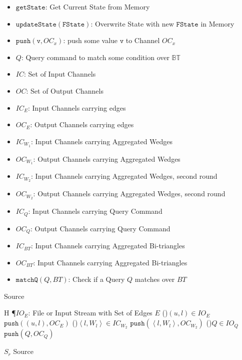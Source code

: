 \documentclass[12pt, a4paper]{article}
\newcommand{\bt}{\mathbb{BT}}
\newcommand{\st}{\mathtt{FState}}
\newcommand{\us}{\mathtt{updateState}}
\newcommand{\gs}{\mathtt{getState}}
\newcommand{\p}{\mathtt{push}}
\newcommand{\mt}{\mathtt{matchQ}}
\newcommand{\la}{\left\langle}
\newcommand{\ra}{\right\rangle}
\begin{document}
\begin{itemize}
      \item $\gs$: Get Current State from Memory
      \item $\us(\st)$: Overwrite State with new $\st$ in Memory
      \item $\p(\mathtt{v}, OC_x)$: push some value $\mathtt{v}$ to Channel $OC_x$
      \item $Q$: Query command to match some condition over $\bt$
      \item $IC$: Set of Input Channels
      \item $OC$: Set of Output Channels    
      \item $IC_E$: Input Channels carrying edges
      \item $OC_E$: Output Channels carrying edges
      \item $IC_{W_1}$: Input Channels carrying Aggregated Wedges
      \item $OC_{W_1}$: Output Channels carrying Aggregated Wedges
      \item $IC_{W_2}$: Input Channels carrying Aggregated Wedges, second round
      \item $OC_{W_2}$: Output Channels carrying Aggregated Wedges, second round
      \item $IC_Q$: Input Channels carrying Query Command
      \item $OC_Q$: Output Channels carrying Query Command
      \item $IC_{BT}$: Input Channels carrying Aggregated Bi-triangles 
      \item $OC_{BT}$: Input Channels carrying Aggregated Bi-triangles 
      \item $\mt(Q, BT)$: Check if a Query $Q$ matches over $BT$ 
\end{itemize}

Source

\begin{algorithm}H
\P{$IO_E$: File or Input Stream with Set of Edges $E$}
\IC{$IC = \la IC_{W_2} \ra$}
\OC{$OC = \la OC_E, OC_{W_2}, OC_Q \ra$}
\ForAll(){$(u,l) \in IO_E$}
{$\p((u,l), OC_E)$
}
\ForAll(){$\la l, W_l \ra \in IC_{W_2}$}
{$\p(\la l, W_l \ra, OC_{W_2})$
}
\ForAll(){$Q \in IO_Q$}
{$\p(Q, OC_Q)$
}
\caption{$S_r$ Source}
\end{algorithm}
\end{document}
